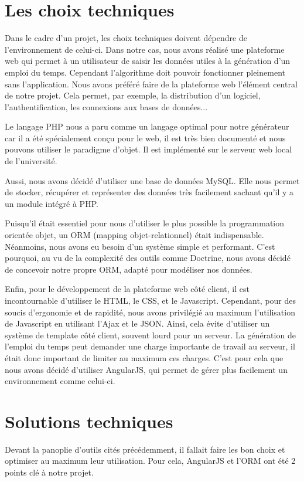 \documentclass[12pt,a4paper,openany]{memoir}
\begin{document}
\section{Les choix techniques}
\par
Dans le cadre d'un projet, les choix techniques doivent dépendre de l'environnement de celui-ci. Dans notre cas, nous avons réalisé une plateforme web qui permet à un utilisateur de saisir les données utiles à la génération d'un emploi du temps. Cependant l'algorithme doit pouvoir fonctionner pleinement sans l'application.
Nous avons préféré faire de la plateforme web l'élément central de notre projet. Cela permet, par exemple, la distribution d'un logiciel, l'authentification, les connexions aux bases de données...
\medbreak
\par
Le langage PHP nous a paru comme un langage optimal pour notre générateur car il a été spécialement conçu pour le web, il est très bien documenté et nous pouvons utiliser le paradigme d'objet. Il est implémenté sur le serveur web local de l'université.
\par
Aussi, nous avons décidé d'utiliser une base de données MySQL. Elle nous permet de stocker, récupérer et représenter des données très facilement sachant qu'il y a un module intégré à PHP.
\par
Puisqu'il était essentiel pour nous d'utiliser le plus possible la programmation orientée objet, un ORM (mapping objet-relationnel) était indispensable. Néanmoins, nous avons eu besoin d'un système simple et performant. C'est pourquoi, au vu de la complexité des outils comme Doctrine, nous avons décidé de concevoir notre propre ORM, adapté pour modéliser nos données.
\medbreak
\par
Enfin, pour le développement de la plateforme web côté client, il est incontournable d'utiliser le HTML, le CSS, et le Javascript. Cependant, pour des soucis d'ergonomie et de rapidité, nous avons privilégié au maximum l'utilisation de Javascript en utilisant l'Ajax et le JSON. Ainsi, cela évite d'utiliser un système de template côté client, souvent lourd pour un serveur. La génération de l'emploi du temps peut demander une charge importante de travail au serveur, il était donc important de limiter au maximum ces charges. C'est pour cela que nous avons décidé d'utiliser AngularJS, qui permet de gérer plus facilement un environnement comme celui-ci.

\clearpage

\section{Solutions techniques}
\par 
Devant la panoplie d'outils cités précédemment, il fallait faire les bon choix et optimiser au maximum leur utilisation. Pour cela, AngularJS et l'ORM ont été 2 points clé à notre projet.
\end{document}
